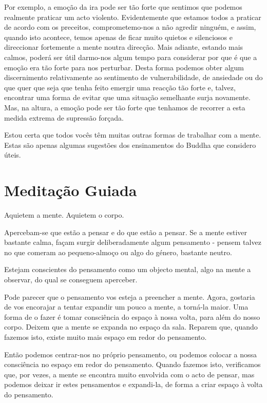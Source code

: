 Por exemplo, a emoção da ira pode ser tão forte que sentimos que podemos
realmente praticar um acto violento. Evidentemente que estamos todos a
praticar de acordo com os preceitos, comprometemo-nos a não agredir
ninguém, e assim, quando isto acontece, temos apenas de ficar muito
quietos e silenciosos e direccionar fortemente a mente noutra direcção.
Mais adiante, estando mais calmos, poderá ser útil darmo-nos algum tempo
para considerar por que é que a emoção era tão forte para nos perturbar.
Desta forma podemos obter algum discernimento relativamente ao
sentimento de vulnerabilidade, de ansiedade ou do que quer que seja que
tenha feito emergir uma reacção tão forte e, talvez, encontrar uma forma
de evitar que uma situação semelhante surja novamente. Mas, na altura, a
emoção pode ser tão forte que tenhamos de recorrer a esta medida extrema
de supressão forçada.

Estou certa que todos vocês têm muitas outras formas de trabalhar com a
mente. Estas são apenas algumas sugestões dos ensinamentos do Buddha que
considero úteis.

\section{Meditação Guiada}

Aquietem a mente. Aquietem o corpo.

Apercebam-se que estão a pensar e do que estão a pensar. Se a mente
estiver bastante calma, façam surgir deliberadamente algum pensamento -
pensem talvez no que comeram ao pequeno-almoço ou algo do género,
bastante neutro.

Estejam conscientes do pensamento como um objecto mental, algo na mente
a observar, do qual se conseguem aperceber.

Pode parecer que o pensamento vos esteja a preencher a mente. Agora,
gostaria de vos encorajar a tentar expandir um pouco a mente, a torná-la
maior. Uma forma de o fazer é tomar consciência do espaço à nossa volta,
para além do nosso corpo. Deixem que a mente se expanda no espaço da
sala. Reparem que, quando fazemos isto, existe muito mais espaço em
redor do pensamento.

Então podemos centrar-nos no próprio pensamento, ou podemos colocar a
nossa consciência no espaço em redor do pensamento. Quando fazemos isto,
verificamos que, por vezes, a mente se encontra muito envolvida com o
acto de pensar, mas podemos deixar ir estes pensamentos e expandi-la, de
forma a criar espaço à volta do pensamento.


